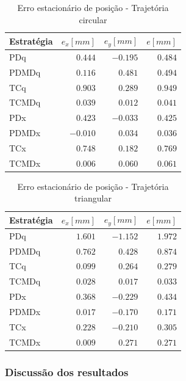 \documentclass[]{politex}
\begin{document}
\begin{table}[H] 
\centering
\caption{Erro estacionário de posição - Trajetória circular}
\label{tab:valorFinalCirculo}
\begin{tabular}{l|r|r|r}
Estratégia & $e_x [mm]$ & $e_y [mm]$ & $e [mm]$ \\ \hline
PDq        & $ 0.444$   & $-0.195$   & $0.484$  \\
PDMDq      & $ 0.116$   & $ 0.481$   & $0.494$  \\
TCq        & $ 0.903$   & $ 0.289$   & $0.949$  \\
TCMDq      & $ 0.039$   & $ 0.012$   & $0.041$  \\
PDx        & $ 0.423$   & $-0.033$   & $0.425$  \\
PDMDx      & $-0.010$   & $ 0.034$   & $0.036$  \\
TCx        & $ 0.748$   & $ 0.182$   & $0.769$  \\
TCMDx      & $ 0.006$   & $ 0.060$   & $0.061$  \\
\end{tabular}
\end{table}

\begin{table}[H] 
\centering
\caption{Erro estacionário de posição - Trajetória triangular}
\label{tab:valorFinalTriangulo}
\begin{tabular}{l|r|r|r}
Estratégia & $e_x [mm]$ & $e_y [mm]$ & $e [mm]$ \\ \hline
PDq        & $ 1.601$   & $-1.152$   & $1.972$  \\
PDMDq      & $ 0.762$   & $ 0.428$   & $0.874$  \\
TCq        & $ 0.099$   & $ 0.264$   & $0.279$  \\
TCMDq      & $ 0.028$   & $ 0.017$   & $0.033$  \\
PDx        & $ 0.368$   & $-0.229$   & $0.434$  \\
PDMDx      & $ 0.017$   & $-0.170$   & $0.171$  \\
TCx        & $ 0.228$   & $-0.210$   & $0.305$  \\
TCMDx      & $ 0.009$   & $ 0.271$   & $0.271$  \\
\end{tabular}
\end{table}

\subsubsection{Discussão dos resultados}
\end{document}
